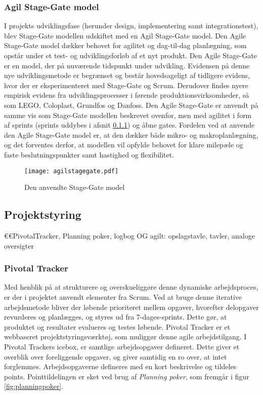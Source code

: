 \subsubsection{Agil Stage-Gate model}
I projekts udviklingsfase (herunder design, implementering samt integrationstest), blev Stage-Gate modellen udskiftet med en Agil Stage-Gate model. Den Agile Stage-Gate model dækker behovet for agilitet og dag-til-dag planlægning, som opstår under et test- og udviklingsforløb af et nyt produkt. Den Agile Stage-Gate er en model, der på nuværende tidspunkt under udvikling. Evidensen på denne nye udviklingsmetode er begrænset og består hovedsageligt af tidligere evidens, hvor der er eksperimenteret med Stage-Gate og Scrum. Derudover findes nyere empirisk evidens fra udviklingsprocesser i førende produktionsvirksomheder, så som LEGO, Coloplast, Grundfos og Danfoss. Den Agile Stage-Gate er anvendt på samme vis som Stage-Gate modellen beskrevet ovenfor, men med agilitet i form af sprints (sprints uddybes i afsnit \ref{subsubsec:pivotal}) og åbne gates. Fordelen ved at anvende den Agile Stage-Gate model er, at den dækker både mikro- og makroplanlægning, og det forventes derfor, at modellen vil opfylde behovet for klare milepæle og faste beslutningspunkter samt hastighed og flexibilitet. 
	   
	\newpage
\begin{landscape}
\begin{figure}
\centering	
\texttt{[image: agilstagegate.pdf]}
\caption{Den anvendte Stage-Gate model}
\label{fig:agilstagegate}
\end{figure}
\end{landscape}

\subsection{Projektstyring}
	€€PivotalTracker, Planning poker, logbog OG agilt: opslagstavle, tavler, analoge oversigter 
	
	\subsubsection{Pivotal Tracker}
	\label{subsubsec:pivotal}
	Med henblik på at strukturere og overskueliggøre denne dynamiske arbejdsproces, er der i projektet anvendt elementer fra Scrum. Ved at bruge denne iterative arbejdsmetode bliver der løbende prioriteret mellem opgaver, hvorefter delopgaver revurderes og planlægges, og styres ud fra 7-dages-sprints. Dette gør, at produktet og resultater evalueres og testes løbende. Pivotal Tracker er et webbaseret projektstyringsværktøj, som muliggør denne agile arbejdstilgang. I Pivotal Trackers icebox, er samtlige arbejdsopgaver defineret. Dette giver et overblik over foreliggende opgaver, og giver samtidig en ro over, at intet forglemmes. Arbejdsopgaverne defineres med en kort beskrivelse og tildeles points. Pointtildelingen er sket ved brug af \textit{Planning poker}, som fremgår i figur \ref{fig:planningpoker}. 
	
